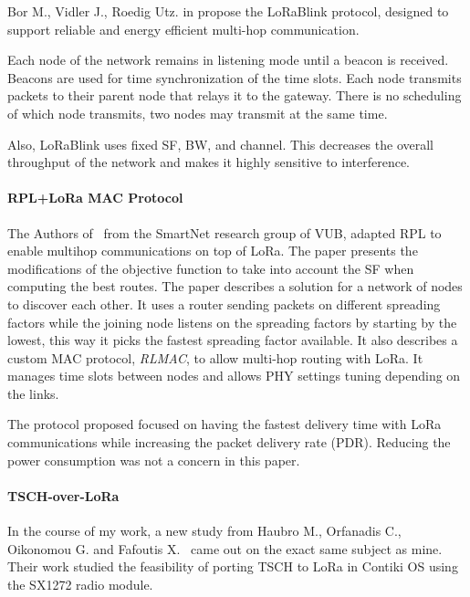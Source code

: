 Bor M., Vidler J., Roedig Utz. in \cite{lorablink} propose the LoRaBlink
protocol, designed to support reliable and energy efficient multi-hop
communication.

Each node of the network remains in listening mode until a beacon is received.
Beacons are used for time synchronization of the time slots.
Each node transmits packets to their parent node that relays it to the gateway.
There is no scheduling of which node transmits, two nodes may
transmit at the same time.


Also, LoRaBlink uses fixed SF, BW, and channel. This decreases the overall throughput 
of the network and makes it highly sensitive to interference.

\paragraph{RPL+LoRa MAC Protocol}

The Authors of~\cite{8115756} from the SmartNet research group of VUB, adapted RPL 
to enable multihop communications on top of LoRa. 
The paper presents the modifications of the objective function to take into
account the SF when computing the best routes.
The paper describes a solution for a network of nodes to discover each other.
It uses a router sending packets on different spreading factors while the joining
node listens on the spreading factors by starting by the lowest, this way it
picks the fastest spreading factor available.
It also describes a custom MAC protocol, \emph{RLMAC}, to allow multi-hop
routing with LoRa. It manages time slots between nodes and allows PHY settings
tuning depending on the links.

The protocol proposed focused on having the fastest delivery time with LoRa
communications while increasing the packet delivery rate (PDR).
Reducing the power consumption was not a concern in this paper.


\paragraph{TSCH-over-LoRa}

In the course of my work, a new study from Haubro M., Orfanadis C.,
Oikonomou G. and Fafoutis X.~\cite{tschoverlora} came out on the exact 
same subject as mine. 
Their work studied the feasibility of porting TSCH to LoRa in Contiki OS using
the SX1272 radio module.

